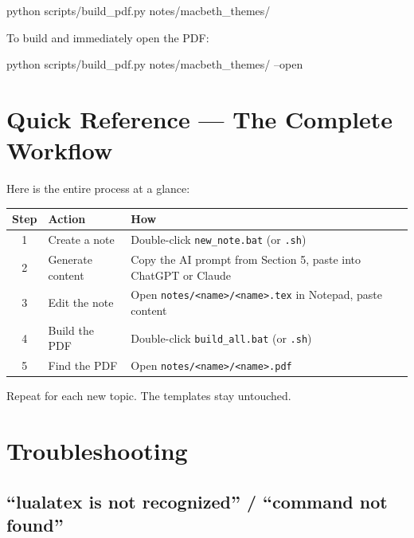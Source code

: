 \documentclass[a4paper,11pt]{article}
\begin{document}
\begin{codebox}
{\monofont python scripts/build\_pdf.py notes/macbeth\_themes/}
\end{codebox}

To build and immediately open the PDF:

\begin{codebox}
{\monofont python scripts/build\_pdf.py notes/macbeth\_themes/ --open}
\end{codebox}

\section{Quick Reference --- The Complete Workflow}

Here is the entire process at a glance:

\begin{center}
\renewcommand{\arraystretch}{1.6}
\begin{tabularx}{\textwidth}{c l X}
\toprule
\textbf{Step} & \textbf{Action} & \textbf{How} \\
\midrule
1 & Create a note & Double-click \texttt{new\_note.bat} (or \texttt{.sh}) \\
2 & Generate content & Copy the AI prompt from Section 5, paste into ChatGPT or Claude \\
3 & Edit the note & Open \texttt{notes/<name>/<name>.tex} in Notepad, paste content \\
4 & Build the PDF & Double-click \texttt{build\_all.bat} (or \texttt{.sh}) \\
5 & Find the PDF & Open \texttt{notes/<name>/<name>.pdf} \\
\bottomrule
\end{tabularx}
\end{center}

Repeat for each new topic. The templates stay untouched.

\section{Troubleshooting}

\subsection{``lualatex is not recognized'' / ``command not found''}
\end{document}
